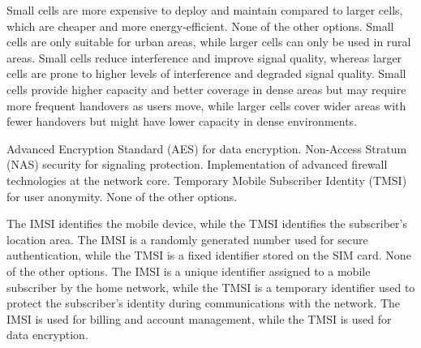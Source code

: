 \begin{questions}
    \begin{checkboxes}
        \choice Small cells are more expensive to deploy and maintain compared to larger cells, which are cheaper and more energy-efficient.
        \choice None of the other options.
        \choice Small cells are only suitable for urban areas, while larger cells can only be used in rural areas.
        \choice Small cells reduce interference and improve signal quality, whereas larger cells are prone to higher levels of interference and degraded signal quality.
        \CorrectChoice Small cells provide higher capacity and better coverage in dense areas but may require more frequent handovers as users move, while larger cells cover wider areas with fewer handovers but might have lower capacity in dense environments.
    \end{checkboxes}

    \begin{checkboxes}
        \CorrectChoice Advanced Encryption Standard (AES) for data encryption.
        \CorrectChoice Non-Access Stratum (NAS) security for signaling protection.
        \choice Implementation of advanced firewall technologies at the network core.
        \choice Temporary Mobile Subscriber Identity (TMSI) for user anonymity.
        \choice None of the other options.
    \end{checkboxes}

    \begin{checkboxes}
        \choice The IMSI identifies the mobile device, while the TMSI identifies the subscriber's location area.
        \choice The IMSI is a randomly generated number used for secure authentication, while the TMSI is a fixed identifier stored on the SIM card.
        \choice None of the other options.
        \CorrectChoice The IMSI is a unique identifier assigned to a mobile subscriber by the home network, while the TMSI is a temporary identifier used to protect the subscriber's identity during communications with the network.
        \choice The IMSI is used for billing and account management, while the TMSI is used for data encryption.
    \end{checkboxes}


\end{questions}